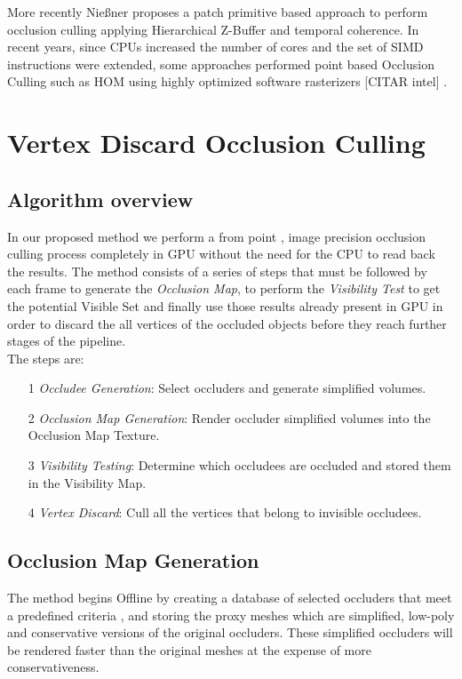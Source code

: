 \documentclass[10pt, conference]{IEEEtran}
\begin{document}
More recently Nie{\ss}ner \cite{occlusion_culling_tessellation} proposes a patch primitive based approach to perform occlusion culling applying Hierarchical Z-Buffer and temporal coherence. 
In recent years, since CPUs increased the number of cores and the set of SIMD instructions were extended, some approaches performed point based Occlusion 
Culling such as HOM using highly optimized software rasterizers \cite{killzone_3} \cite{frostbite} [CITAR intel] \cite{cacic_occlusion_2}.


\section{Vertex Discard Occlusion Culling}
%

\subsection{Algorithm overview}
%
In our proposed method we perform a from point , image precision \cite{survey_visibility} occlusion culling process completely in GPU without the need for the CPU to read back the results. 
The method consists of a series of steps that must be followed by each frame to generate the \emph{Occlusion Map}, to perform the \emph{Visibility Test} to 
get the potential Visible Set and finally use those results already present in GPU in order to discard the all vertices of the occluded objects before they reach further stages of the pipeline.\\

The steps are:
\begin{itemize}
	\item[1] \emph{Occludee Generation}: Select occluders and generate simplified volumes.
	\item[2] \emph{Occlusion Map Generation}: Render occluder simplified volumes into the Occlusion Map Texture.
	\item[3] \emph{Visibility Testing}: Determine which occludees are occluded and stored them in the Visibility Map.
	\item[4] \emph{Vertex Discard}: Cull all the vertices that belong to invisible occludees.
\end{itemize}


\subsection{Occlusion Map Generation}
%
The method begins Offline by creating a database of selected occluders that meet a predefined criteria \cite{cacic_occlusion_1}, 
and storing the proxy meshes which are simplified, low-poly and conservative versions of the original occluders. 
These simplified occluders will be rendered faster than the original meshes at the expense of more conservativeness.\\
\end{document}
